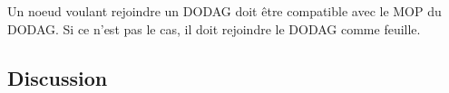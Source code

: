    Un noeud voulant rejoindre un DODAG doit être compatible avec le MOP du DODAG. Si ce n'est pas le cas, il doit rejoindre le DODAG comme feuille.



\subsection*{Discussion}

